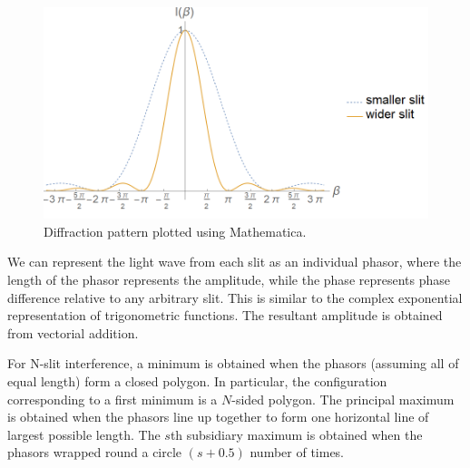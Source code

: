 \documentclass[a4paper]{article}
\begin{document}
\begin{figure}[H]
    \centering
    \includegraphics[scale=0.5]{diffraction.PNG}
    \caption{Diffraction pattern plotted using Mathematica.}
    \label{diffraction}
\end{figure}
\begin{defi}
We can represent the light wave from each slit as an individual phasor, where the length of the phasor represents the amplitude, while the phase represents phase difference relative to any arbitrary slit. This is similar to the complex exponential representation of trigonometric functions. The resultant amplitude is obtained from vectorial addition.
\end{defi}
\begin{thm}
For N-slit interference, a minimum is obtained when the phasors (assuming all of equal length) form a closed polygon. In particular, the configuration corresponding to a first minimum is a $N$-sided polygon. The principal maximum is obtained when the phasors line up together to form one horizontal line of largest possible length. The $s$th subsidiary maximum is obtained when the phasors wrapped round a circle $(s+0.5)$ number of times. 
\end{thm}
\end{document}
